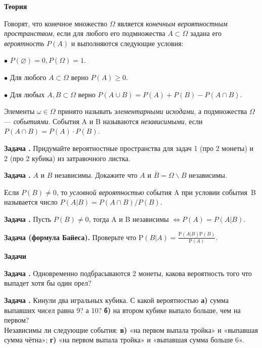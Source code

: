 \documentclass[11pt,a4paper]{article}
\def\P{\mathrm{P}}
\newcounter{znum}
\newcommand{\z}[1]{\addtocounter{znum}{1} \textbf{Задача \arabic{znum}#1. }}
\renewcommand{\!}{\textcolor{red}{!}}
\begin{document}
\pagestyle{empty}


\begin{center}
	\large
	\textbf{Теория}
	\normalsize
\end{center}

Говорят, что конечное множество $\Omega$ является \emph{конечным вероятностным пространством}, если для любого его подмножества $A \subset \Omega$ задана его \emph{вероятность} $P(A)$ и выполняются следующие условия:

$\bullet$ $P(\varnothing) = 0, P(\Omega) = 1$.

$\bullet$ Для любого $A \subset \Omega$ верно $P(A) \geqslant 0$.

$\bullet$ Для любых $A, B\subset \Omega$ верно $P(A\cup B) = P(A) + P(B) - P(A\cap B)$.

Элементы $\omega \in \Omega$ принято называть \emph{элементарными исходами}, а подмножества $\Omega$ --- \emph{событиями}. События A и B называются \emph{независимыми}, если $P(A \cap B) = P(A) \cdot P(B)$.

\z{} Придумайте вероятностные пространства для задач 1 (про 2 монеты) и 2 (про 2 кубика) из затравочного листка.

\z{} $A$ и $B$ независимы. Докажите что $A$ и $\overline{B} = \Omega \backslash B$ независимы.

\vspace{0.3cm}

Если $P(B) \ne 0$, то \emph{условной вероятностью} события A при условии события~B называется число $P(A|B) = P(A \cap B)/P(B)$.

\vspace{0.3cm}

\z{} Пусть $P(B) \ne 0$, тогда A и B независимы $ \Leftrightarrow P(A) = P(A|B)$.

\z{ (формула Байеса)} Проверьте что $\P(B | A) = \frac{\P(A | B)\P(B)}{\P(A)}$.

\begin{center}
	\large
	\textbf{Задачи}
	\normalsize
\end{center}

\z{} Одновременно подбрасываются 2 монеты, какова вероятность того что выпадет хотя бы один орел?

\z{} Кинули два игральных кубика. С какой вероятностью \textbf{а)} сумма выпавших чисел равна 9? а 10? \textbf{б)} на втором кубике выпало больше, чем на первом?\\
Независимы ли следующие события: \textbf{в)} «на первом выпала тройка» и «выпавшая сумма чётна»; \textbf{г)} «на первом выпала тройка» и «выпавшая сумма больше 6».
\end{document}
